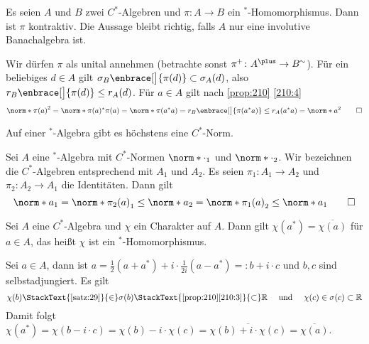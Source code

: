 \begin{korollar}[label=kor:211,{name=[*-Homomorphismen sind kontraktiv]}]
	Es seien $A$ und $B$ zwei $C^*$-Algebren und $\pi \colon A \to B$ ein ${}^*$-Homomorphismus. Dann ist $\pi$ kontraktiv.
	Die Aussage bleibt richtig, falls $A$ nur eine involutive Banachalgebra ist. 
\end{korollar}
\begin{beweis}
	Wir dürfen $\pi$ als unital annehmen (betrachte sonst $\pi^{\hspace{-0.5pt}+}\colon A^\plus \to B^{\hspace{-0.5pt}\sim}$). 
	Für ein beliebiges $d \in A$ gilt $\sigma_B \enbrace[\big]{\pi(d)} \subset \sigma_A(d)$, also $r_B \enbrace[\big]{\pi(d)} \le r_A(d)$. 
	Für $a \in A$ gilt nach \autoref{prop:210} \ref{210:4}
	\[
		\norm*{\pi(a)}^2 = \norm*{\pi(a)^* \pi(a)} = \norm*{\pi(a^*a)} = r_B \enbrace[\big]{\pi(a^*a)} \le r_A(a^*a) = \norm*{a}^2 \qedhere
	\]
\end{beweis}

\begin{korollar}[{name=[höchstens eine $C^*$-Norm]},label=korr:212]
	Auf einer ${}^*$-Algebra gibt es höchstens eine $C^*$-Norm.
\end{korollar}
\begin{beweis}
	Sei $A$ eine ${}^*$-Algebra mit $C^*$-Normen $\norm*{\cdot}_1$ und $\norm*{\cdot}_2$. 
	Wir bezeichnen die $C^*$-Algebren entsprechend mit $A_1$ und $A_2$. 
	Es seien $\pi_1 \colon A_1 \to A_2$ und $\pi_2 \colon A_2 \to A_1$ die Identitäten. Dann gilt
	\[
		\norm*{a}_1 = \norm*{\pi_2(a)}_1 \le \norm*{a}_2 = \norm*{\pi_1(a)}_2 \le \norm*{a}_1 \qedhere
	\]
\end{beweis}

\begin{korollar}[label=kor:213,{name=[Charaktere sind *-Homomorphismen]}]
	Sei $A$ eine $C^*$-Algebra und $\chi$ ein Charakter auf $A$. Dann gilt $\chi(a^*) = \overline{\chi(a)}$ für $a \in A$, das heißt $\chi$ ist ein ${}^*$-Homomorphismus.
\end{korollar}
\begin{beweis}
	Sei $a \in A$, dann ist $a=\frac{1}{2}(a+a^*) + i \cdot \frac{1}{2i}(a-a^*) =: b + i \cdot c$ und $b,c$ sind selbstadjungiert. Es gilt 
	\[
		\chi(b) \StackText{\ref{satz:29}}{\in} \sigma(b) \StackText{\ref{prop:210}\ref{210:3}}{\subset} \mathbb{R} \quad \text{ und } \quad \chi(c) \in \sigma(c) \subset \mathbb{R} 
	\]
	Damit folgt $\chi(a^*) = \chi(b - i \cdot c) = \chi(b) - i \cdot \chi(c) = \overline{\chi(b) + i \cdot \chi(c)} = \overline{\chi(a)}$.
\end{beweis}

